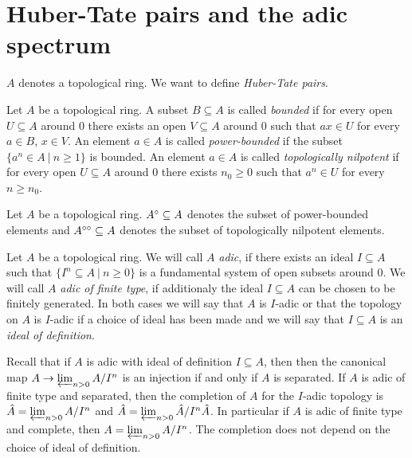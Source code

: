 \section{Huber-Tate pairs and the adic spectrum}

$A$ denotes a topological ring. We want to define \emph{Huber-Tate pairs}.

\begin{definition}
Let $A$ be a topological ring.
A subset $B\subseteq A$ is called \emph{bounded} if for every open $U\subseteq A$ around $0$ there exists an open $V\subseteq A$ around $0$
such that $ax\in U$ for every $a\in B$, $x\in V$.
An element $a\in A$ is called \emph{power-bounded} if the subset $\{a^n\in A\:\vert\: n\geq1\}$ is bounded.
An element $a\in A$ is called \emph{topologically nilpotent} if for every open $U\subseteq A$ around $0$ there exists $n_0\geq0$ such that
$a^n\in U$ for every $n\geq n_0$.
\end{definition}

\begin{definition}
Let $A$ be a topological ring.
$A{^{\circ}}\subseteq A$ denotes the subset of power-bounded elements and
$A^{\circ\circ}\subseteq A$ denotes the subset of topologically nilpotent elements.
\end{definition}


\begin{definition}
Let $A$ be a topological ring. 
We will call $A$ \emph{adic}, if there exists an ideal $I\subseteq A$ such that $\{I^n\subseteq A\:\vert\: n\geq 0\}$ is a fundamental system of open subsets
around $0$.
We will call $A$ \emph{adic of finite type}, if additionaly the ideal $I\subseteq A$ can be chosen to be finitely generated.
In both cases we will say that $A$ is $I$-adic or that the topology on $A$ is $I$-adic if a choice of ideal has been made and we will say that
$I\subseteq A$ is an \emph{ideal of definition}.
\end{definition}

Recall that if $A$ is adic with ideal of definition $I\subseteq A$, then then the canonical map $A\to\varprojlim_{n>0}A/I^n$ is an injection if and only if $A$ is separated.
If $A$ is adic of finite type and separated, then the completion of $A$ for the $I$-adic topology is $\hat{A}=\varprojlim_{n>0}A/I^n$ and $\hat{A}=\varprojlim_{n>0}\hat{A}/I^n\hat{A}$.
In particular if $A$ is adic of finite type and complete, then $A=\varprojlim_{n>0}A/I^n$. The completion does not depend on the choice of ideal of definition.



